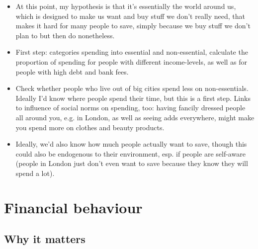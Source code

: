 \documentclass[a4paper, 11pt]{report}
\begin{document}
\begin{itemize}
	\item At this point, my hypothesis is that it's essentially the world around us, which is designed to make us want and buy stuff we don't really need, that makes it hard for many people to save, simply because we buy stuff we don't plan to but then do nonetheless.

	\item First step: categories spending into essential and non-essential, calculate the proportion of spending for people with different income-levels, as well as for people with high debt and bank fees.

	\item Check whether people who live out of big cities spend less on non-essentials. Ideally I'd know where people spend their time, but this is a first step. Links to influence of social norms on spending, too: having fancily dressed people all around you, e.g. in London, as well as seeing adds everywhere, might make you spend more on clothes and beauty products.

	\item Ideally, we'd also know how much people actually want to save, though this could also be endogenous to their environment, esp. if people are self-aware (people in London just don't even want to save because they know they will spend a lot).
\end{itemize}









						\part{Financial behaviour}


						\chapter{Why it matters}
\end{document}
